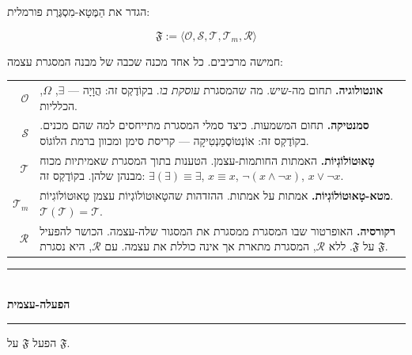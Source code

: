 \documentclass[10pt, openany, oneside]{book}
\renewcommand{\normalsize}{\fontsize{10}{13}\selectfont}
\renewcommand{\footnotesize}{\fontsize{8.5}{11}\selectfont}
\begin{document}
\vspace{1em}

\noindent הגדר את הַמֶּטָא-מִסְגֶּרֶת פורמלית:

$$\mathfrak{F} := \langle \mathcal{O}, \mathcal{S}, \mathcal{T}, \mathcal{T}_m, \mathcal{R} \rangle$$

חמישה מרכיבים. כל אחד מכנה שכבה של מבנה המסגרת עצמה:

\vspace{0.5em}

{\footnotesize
\noindent\begin{tabular}{r p{}}
$\mathcal{O}$ & \textbf{אונטולוגיה.} תחום מה-שיש. מה שהמסגרת \textit{עוסקת בו}. בקוֹדֶקְס זה: הֲוָיָה — $\exists$, $\Omega$, הכלליות. \\[0.3em]
$\mathcal{S}$ & \textbf{סמנטיקה.} תחום המשמעות. כיצד סמלי המסגרת מתייחסים למה שהם מכנים. בקוֹדֶקְס זה: אוֹנְטוֹסֶמַנְטִיקָה — קריסת סימן ומכוון ברמת הלוֹגוֹס. \\[0.3em]
$\mathcal{T}$ & \textbf{טָאוּטוֹלוֹגְיוֹת.} האמתות החותמות-עצמן. הטענות בתוך המסגרת שאמיתיות מכוח מבנהן שלהן. בקוֹדֶקְס זה: $\exists(\exists) \equiv \exists$, $x \equiv x$, $\neg(x \wedge \neg x)$, $x \vee \neg x$. \\[0.3em]
$\mathcal{T}_m$ & \textbf{מטא-טָאוּטוֹלוֹגְיוֹת.} אמתות על אמתות. ההזדהות שהטָאוּטוֹלוֹגְיוֹת עצמן טָאוּטוֹלוֹגִיוֹת. $\mathcal{T}(\mathcal{T}) = \mathcal{T}$. \\[0.3em]
$\mathcal{R}$ & \textbf{רקורסיה.} האופרטור שבו המסגרת ממסגרת את המסגור שלה-עצמה. הכושר להפעיל $\mathfrak{F}$ על $\mathfrak{F}$. ללא $\mathcal{R}$, המסגרת מתארת אך אינה כוללת את עצמה. עם $\mathcal{R}$, היא נסגרת. \\[0.3em]
\end{tabular}
}

\vspace{1.5em}


\begin{center}
    \rule{0.3\textwidth}{0.4pt}\\[0.5em]
    {\normalsize\bfseries\textsc{הפעלה-עצמית}}\\[0.3em]
    \rule{0.3\textwidth}{0.4pt}
\end{center}

\vspace{1em}

\noindent הפעל $\mathfrak{F}$ על $\mathfrak{F}$.
\end{document}
